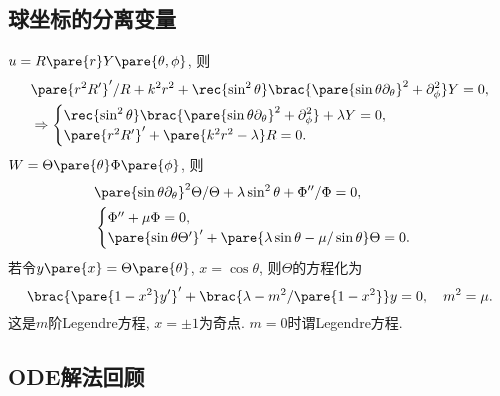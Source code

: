 \documentclass[hidelinks]{ctexart}
\begin{document}

\subsection{球坐标的分离变量} %
\label{sub:球坐标的分离变量}

 $u = R\pare{r} Y\pare{\theta,\phi}$, 则
\begin{align*}
    & \pare{r^2R'}'/R + k^2r^2 + \rec{\sin^2\theta}\brac{\pare{\sin\theta\partial_\theta}^2+\partial_\phi^2} Y = 0, \\
    & \Rightarrow \begin{cases}
        \displaystyle \rec{\sin^2\theta}\brac{\pare{\sin\theta\partial_\theta}^2 + \partial_\phi^2} + \lambda Y = 0, \\
        \pare{r^2R'}' + \pare{k^2r^2 - \lambda}R = 0.
    \end{cases}
\end{align*}
 $W = \Theta\pare{\theta}\Phi\pare{\phi}$, 则
\begin{align*}
    & \pare{\sin\theta\partial_\theta}^2 \Theta/\Theta + \lambda \sin^2\theta + \Phi''/\Phi = 0, \\
    & \begin{cases}
        \Phi'' + \mu \Phi = 0, \\
        \pare{\sin\theta\Theta'}' + \pare{\lambda \sin\theta - \mu/\sin\theta} \Theta = 0.
    \end{cases}
\end{align*}
若令$y\pare{x} = \Theta\pare{\theta}$, $x=\cos\theta$, 则$\Theta$的方程化为
\[ \brac{\pare{1-x^2}y'}' + \brac{\lambda - m^2/\pare{1-x^2}}y = 0,\quad m^2=\mu. \]
这是$m$阶Legendre方程, $x=\pm 1$为奇点. $m=0$时谓Legendre方程.


\subsection{ODE解法回顾} %
\label{sub:ode解法回顾}
\end{document}
